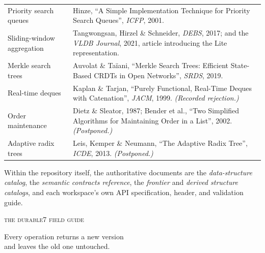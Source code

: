 \documentclass[11pt,twoside,openright]{book}
\makeatletter
\newenvironment{d7table}[1]
  {\par\vspace{3pt}\small
   \setlength{\LTpre}{4pt}\setlength{\LTpost}{4pt}
   \begin{longtable}{@{}%
     >{\raggedright\arraybackslash}p{#1\textwidth}%
     @{\hspace{10pt}}%
     >{\raggedright\arraybackslash}p{\dimexpr\textwidth-#1\textwidth-10pt\relax}@{}}}
  {\end{longtable}}
\makeatother
\begin{document}
\begin{d7table}{0.34}
Priority search queues & Hinze, ``A Simple Implementation Technique for Priority
Search Queues'', \textit{ICFP}, 2001. \\
Sliding-window aggregation & Tangwongsan, Hirzel \& Schneider, \textit{DEBS},
2017; and the \textit{VLDB Journal}, 2021, article introducing the Lite
representation. \\
Merkle search trees & Auvolat \& Taïani, ``Merkle Search Trees: Efficient
State-Based CRDTs in Open Networks'', \textit{SRDS}, 2019. \\
Real-time deques & Kaplan \& Tarjan, ``Purely Functional, Real-Time Deques with
Catenation'', \textit{JACM}, 1999. \emph{(Recorded rejection.)} \\
Order maintenance & Dietz \& Sleator, 1987; Bender et al., ``Two Simplified
Algorithms for Maintaining Order in a List'', 2002. \emph{(Postponed.)} \\
Adaptive radix trees & Leis, Kemper \& Neumann, ``The Adaptive Radix Tree'',
\textit{ICDE}, 2013. \emph{(Postponed.)} \\
\bottomrule
\end{d7table}

\bigskip
\noindent
Within the repository itself, the authoritative documents are the
\textit{data-structure catalog}, the \textit{semantic contracts reference}, the
\textit{frontier} and \textit{derived structure catalogs}, and each workspace's
own API specification, header, and validation guide.

\backmatter

\cleardoublepage
{}
{}
{\small
 \setlength{\columnsep}{18pt}
 \renewcommand{\indexname}{Index}
 \printindex}

\cleardoublepage
\thispagestyle{empty}
\null\vfill
\begin{center}

\vspace{22pt}
{\sffamily\footnotesize\color{d7slate}
 \textsc{the durable7 field guide}\par
 \vspace{4pt}
 Every operation returns a new version\\and leaves the old one untouched.\par}
\end{center}
\vfill
\end{document}
